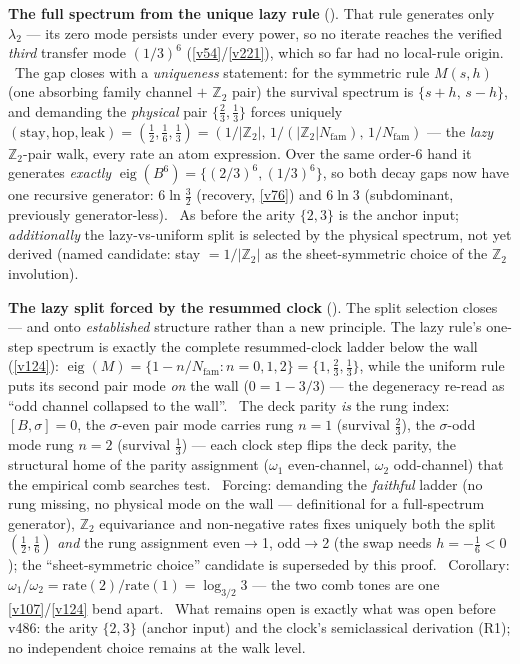 \documentclass[11pt,a4paper]{article}
\newcommand{\Nfam}{N_{\mathrm{fam}}}
\newcommand{\Z}{\mathbb Z}
\begin{document}
\par\smallskip\noindent\textbf{The full spectrum from the unique lazy rule}
(). That rule generates only $\lambda_2$ --- its zero mode persists under
every power, so no iterate reaches the verified \emph{third} transfer mode $(1/3)^6$ (\vref{v54}/\vref{v221}),
which so far had no local-rule origin. \mE\ The gap closes with a \emph{uniqueness} statement: for the symmetric
rule $M(s,h)$ (one absorbing family channel $+$ $\Z_2$ pair) the survival spectrum is $\{s{+}h,\,s{-}h\}$, and
demanding the \emph{physical} pair $\{\tfrac23,\tfrac13\}$ forces uniquely
$(\mathrm{stay},\mathrm{hop},\mathrm{leak})=(\tfrac12,\tfrac16,\tfrac13)=(1/|\Z_2|,\,1/(|\Z_2|\Nfam),\,1/\Nfam)$
--- the \emph{lazy} $\Z_2$-pair walk, every rate an atom expression. Over the same order-$6$ hand it generates
\emph{exactly} $\operatorname{eig}(B^6)=\{(2/3)^6,(1/3)^6\}$, so both decay gaps now have one recursive
generator: $6\ln\tfrac32$ (recovery, \vref{v76}) and $6\ln3$ (subdominant, previously generator-less). \mO\ As
before the arity $\{2,3\}$ is the anchor input; \emph{additionally} the lazy-vs-uniform split is selected by the
physical spectrum, not yet derived (named candidate: stay $=1/|\Z_2|$ as the sheet-symmetric choice of the
$\Z_2$ involution).

\par\smallskip\noindent\textbf{The lazy split forced by the resummed clock}
(). The split selection closes --- and onto \emph{established} structure
rather than a new principle. The lazy rule's one-step spectrum is exactly the complete resummed-clock ladder
below the wall (\vref{v124}): $\operatorname{eig}(M)=\{1-n/\Nfam:n=0,1,2\}=\{1,\tfrac23,\tfrac13\}$, while the
uniform rule puts its second pair mode \emph{on} the wall ($0=1-3/3$) --- the degeneracy re-read as ``odd channel
collapsed to the wall''. \mE\ The deck parity \emph{is} the rung index: $[B,\sigma]=0$, the $\sigma$-even pair
mode carries rung $n{=}1$ (survival $\tfrac23$), the $\sigma$-odd mode rung $n{=}2$ (survival $\tfrac13$) ---
each clock step flips the deck parity, the structural home of the parity assignment ($\omega_1$ even-channel,
$\omega_2$ odd-channel) that the empirical comb searches test. \mE\ Forcing: demanding the \emph{faithful} ladder
(no rung missing, no physical mode on the wall --- definitional for a full-spectrum generator), $\Z_2$
equivariance and non-negative rates fixes uniquely both the split $(\tfrac12,\tfrac16)$ \emph{and} the rung
assignment even${}\to{}$1, odd${}\to{}$2 (the swap needs $h=-\tfrac16<0$); the ``sheet-symmetric choice''
candidate is superseded by this proof. \mE\ Corollary: $\omega_1/\omega_2=\mathrm{rate}(2)/\mathrm{rate}(1)
=\log_{3/2}3$ --- the two comb tones are one \vref{v107}/\vref{v124} bend apart. \mO\ What remains open is
exactly what was open before v486: the arity $\{2,3\}$ (anchor input) and the clock's semiclassical derivation
(R1); no independent choice remains at the walk level.
\end{document}
